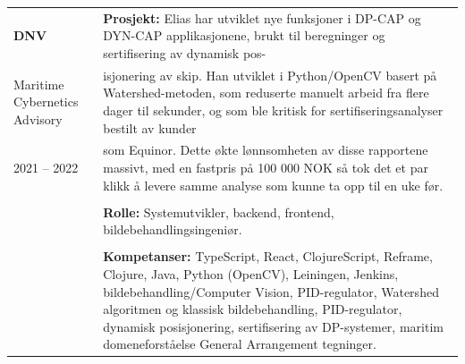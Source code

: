 \documentclass[a4paper,10pt]{article}
\begin{document}
\vspace{2em}

\noindent
\begin{longtable}{@{}p{4cm}p{11cm}@{}}  %
\textbf{DNV} 
& \textbf{Prosjekt:} Elias har utviklet nye funksjoner i DP-CAP og DYN-CAP applikasjonene, brukt til beregninger og sertifisering av dynamisk pos-\\
Maritime Cybernetics Advisory & isjonering av skip. Han utviklet i Python/OpenCV basert på Watershed-metoden, som reduserte manuelt arbeid fra flere dager til sekunder, og som ble kritisk for sertifiseringsanalyser bestilt av kunder\\
2021 -- 2022 & som Equinor. Dette økte lønnsomheten av disse rapportene massivt, med en fastpris på 100 000 NOK så tok det et par klikk å levere samme analyse som kunne ta opp til en uke før. \\
& \\
& \textbf{Rolle:} Systemutvikler, backend, frontend, bildebehandlingsingeniør. \\
& \\
& \textbf{Kompetanser:} TypeScript, React, ClojureScript, Reframe, Clojure, Java, Python (OpenCV), Leiningen, Jenkins, bildebehandling/Computer Vision, PID-regulator, Watershed algoritmen og klassisk bildebehandling, PID-regulator, dynamisk posisjonering, sertifisering av DP-systemer, maritim domeneforståelse General Arrangement tegninger. \\
\end{longtable}
 


 
\end{document}
